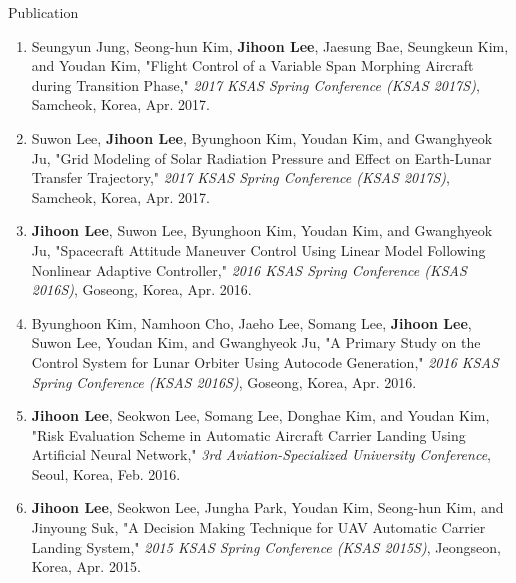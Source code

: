 \documentclass{resume}
\begin{document}
\begin{rSection}{Publication}
\begin{enumerate}
		\item Seungyun Jung, Seong-hun Kim, \textbf{Jihoon Lee}, Jaesung Bae, Seungkeun Kim, and Youdan Kim, "Flight Control of a Variable Span Morphing Aircraft during Transition Phase," \textit{2017 KSAS Spring Conference (KSAS 2017S)}, Samcheok, Korea, Apr. 2017. 
		
		\item Suwon Lee, \textbf{Jihoon Lee}, Byunghoon Kim, Youdan Kim, and Gwanghyeok Ju, "Grid Modeling of Solar Radiation Pressure and Effect on Earth-Lunar Transfer Trajectory," \textit{2017 KSAS Spring Conference (KSAS 2017S)}, Samcheok, Korea, Apr. 2017. 
		
		\item \textbf{Jihoon Lee}, Suwon Lee, Byunghoon Kim, Youdan Kim, and Gwanghyeok Ju, "Spacecraft Attitude Maneuver Control Using Linear Model Following Nonlinear Adaptive Controller," \textit{2016 KSAS Spring Conference (KSAS 2016S)}, Goseong, Korea, Apr. 2016. 
		
		\item Byunghoon Kim, Namhoon Cho, Jaeho Lee, Somang Lee, \textbf{Jihoon Lee}, Suwon Lee, Youdan Kim, and Gwanghyeok Ju, "A Primary Study on the Control System for Lunar Orbiter Using Autocode Generation," \textit{2016 KSAS Spring Conference (KSAS 2016S)}, Goseong, Korea, Apr. 2016. 
		
		\item \textbf{Jihoon Lee}, Seokwon Lee, Somang Lee, Donghae Kim, and Youdan Kim, "Risk Evaluation Scheme in Automatic Aircraft Carrier Landing Using Artificial Neural Network," \textit{3rd Aviation-Specialized University Conference}, Seoul, Korea, Feb. 2016.
		
		\item \textbf{Jihoon Lee}, Seokwon Lee, Jungha Park, Youdan Kim, Seong-hun Kim, and Jinyoung Suk, "A Decision Making Technique for UAV Automatic Carrier Landing System," \textit{2015 KSAS Spring Conference (KSAS 2015S)}, Jeongseon, Korea, Apr. 2015. 
	\end{enumerate}\renewcommand{\labelenumi}{\theenumi.}
\end{rSection}
\end{document}
